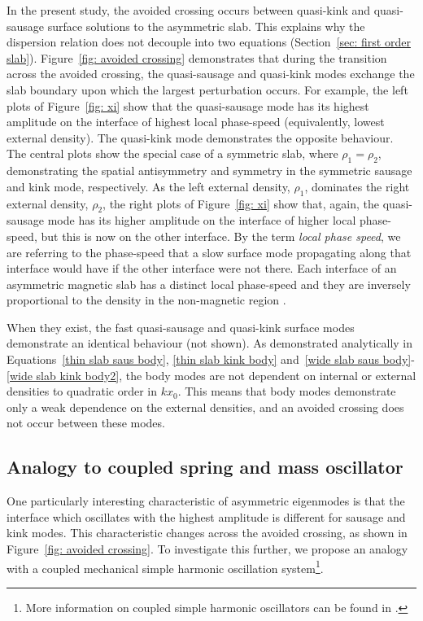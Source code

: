 In the present study, the avoided crossing occurs between quasi-kink and quasi-sausage surface solutions to the asymmetric slab. This explains why the dispersion relation does not decouple into two equations (Section~\ref{sec: first order slab}). Figure~\ref{fig: avoided crossing} demonstrates that during the transition across the avoided crossing, the quasi-sausage and quasi-kink modes exchange the slab boundary upon which the largest perturbation occurs. For example, the left plots of Figure~\ref{fig: xi} show that the quasi-sausage mode has its highest amplitude on the interface of highest local phase-speed (equivalently, lowest external density). The quasi-kink mode demonstrates the opposite behaviour. The central plots show the special case of a symmetric slab, where $\rho_1 = \rho_2$, demonstrating the spatial antisymmetry and symmetry in the symmetric sausage and kink mode, respectively. As the left external density, $\rho_1$, dominates the right external density, $\rho_2$, the right plots of Figure~\ref{fig: xi} show that, again, the quasi-sausage mode has its higher amplitude on the interface of higher local phase-speed, but this is now on the other interface. By the term \textit{local phase speed}, we are referring to the phase-speed that a slow surface mode propagating along that interface would have if the other interface were not there. Each interface of an asymmetric magnetic slab has a distinct local phase-speed and they are inversely proportional to the density in the non-magnetic region \citep{rob81a}.

When they exist, the fast quasi-sausage and quasi-kink surface modes demonstrate an identical behaviour (not shown). As demonstrated analytically in Equations~\eqref{thin slab saus body}, \eqref{thin slab kink body} and~\eqref{wide slab saus body}-\eqref{wide slab kink body2}, the body modes are not dependent on internal or external densities to quadratic order in $kx_0$. This means that body modes demonstrate only a weak dependence on the external densities, and an avoided crossing does not occur between these modes.


\subsection{Analogy to coupled spring and mass oscillator} \label{sec: mechanical example}
One particularly interesting characteristic of asymmetric eigenmodes is that the interface which oscillates with the highest amplitude is different for sausage and kink modes. This characteristic changes across the avoided crossing, as shown in Figure~\eqref{fig: avoided crossing}. To investigate this further, we propose an analogy with a coupled mechanical simple harmonic oscillation system\footnote{More information on coupled simple harmonic oscillators can be found in \cite{nov10}.}.

